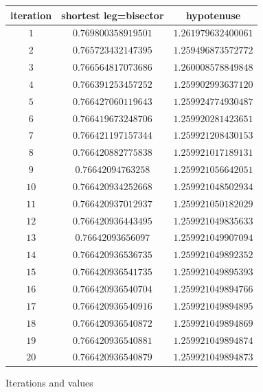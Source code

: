 \documentclass[12pt, letterpaper, oneside]{report}
\begin{document}
\begin{tabular}{|c|c|c|} \hline
\centering
\textbf{iteration}	& \textbf{shortest leg=bisector} & \textbf{hypotenuse}\\	\hline
	$1$         & $0.769800358919501$ & $1.261979632400061$ \\ \hline
	$2$         & $0.765723432147395$ & $1.259496873572772$ \\ \hline
	$3$         & $0.766564817073686$ & $1.260008578849848$ \\ \hline
	$4$         & $0.766391253457252$ & $1.259902993637120$ \\ \hline
	$5$         & $0.766427060119643$ & $1.259924774930487$ \\ \hline
	$6$         & $0.766419673248706$ & $1.259920281423651$ \\ \hline
	$7$         & $0.766421197157344$ & $1.259921208430153$ \\ \hline
	$8$         & $0.766420882775838$ & $1.259921017189131$ \\ \hline
	$9$        & $0.76642094763258$ & $1.259921056642051$ \\ \hline
	$10$        & $0.766420934252668$ & $1.259921048502934$ \\ \hline
	$11$        & $0.766420937012937$ & $1.259921050182029$ \\ \hline
	$12$        & $0.766420936443495$ & $1.259921049835633$ \\ \hline
	$13$        & $0.76642093656097$ & $1.259921049907094$ \\ \hline
	$14$        & $0.766420936536735$ & $1.259921049892352$ \\ \hline
	$15$        & $0.766420936541735$ & $1.259921049895393$ \\ \hline
	$16$        & $0.766420936540704$ & $1.259921049894766$ \\ \hline
	$17$        & $0.766420936540916$ & $1.259921049894895$ \\ \hline
	$18$        & $0.766420936540872$ & $1.259921049894869$ \\ \hline
	$19$        & $0.766420936540881$ & $1.259921049894874$ \\ \hline
	$20$        & $0.766420936540879$ & $1.259921049894873$ \\ \hline

\end{tabular} 
\begin{table}[H] %
	\caption {Iterations and values}
	\label{iterations and values}
\end{table}
\end{document}
